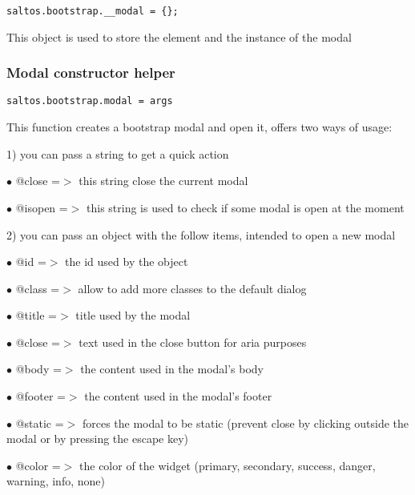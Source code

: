 \documentclass[a4paper]{article}
\begin{document}
\begin{lstlisting}
saltos.bootstrap.__modal = {};
\end{lstlisting}

This object is used to store the element and the instance of the modal

\hypertarget{toc663}{}
\subsubsection{Modal constructor helper}

\begin{lstlisting}
saltos.bootstrap.modal = args
\end{lstlisting}

This function creates a bootstrap modal and open it, offers two ways of usage:

1) you can pass a string to get a quick action

\begin{compactitem}
\item[\color{myblue}$\bullet$] @close   =$>$ this string close the current modal
\item[\color{myblue}$\bullet$] @isopen  =$>$ this string is used to check if some modal is open at the moment
\end{compactitem}

2) you can pass an object with the follow items, intended to open a new modal

\begin{compactitem}
\item[\color{myblue}$\bullet$] @id      =$>$ the id used by the object
\item[\color{myblue}$\bullet$] @class   =$>$ allow to add more classes to the default dialog
\item[\color{myblue}$\bullet$] @title   =$>$ title used by the modal
\item[\color{myblue}$\bullet$] @close   =$>$ text used in the close button for aria purposes
\item[\color{myblue}$\bullet$] @body    =$>$ the content used in the modal's body
\item[\color{myblue}$\bullet$] @footer  =$>$ the content used in the modal's footer
\item[\color{myblue}$\bullet$] @static  =$>$ forces the modal to be static (prevent close by clicking outside the modal or
            by pressing the escape key)
\item[\color{myblue}$\bullet$] @color   =$>$ the color of the widget (primary, secondary, success, danger, warning, info, none)
\end{compactitem}
\end{document}
